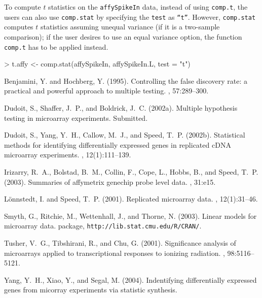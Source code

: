 \documentclass[11pt]{article}
\newcommand{\code}[1]{{\tt #1}}
\newcommand{\Rfunc}[1]{{\tt #1}}
\begin{document}
To compute $t$ statistics on the \code{affySpikeIn} data, instead of using
\Rfunc{comp.t}, the users can also use \Rfunc{comp.stat} by specifying 
the \code{test} as \code{``t''}. However, \Rfunc{comp.stat} computes $t$ 
statistics assuming unequal variance (if it is a two-sample comparison); if
the user desires to use an equal variance option, the function \Rfunc{comp.t}
has to be applied instead.

\begin{Schunk}
\begin{Sinput}
> t.affy <- comp.stat(affySpikeIn, affySpikeIn.L, test = "t")
\end{Sinput}
\end{Schunk}


\begin{thebibliography}{}

Benjamini, Y. and Hochberg, Y. (1995).
\newblock Controlling the false discovery rate: a practical and powerful
  approach to multiple testing.
, 57:289--300.

Dudoit, S., Shaffer, J.~P., and Boldrick, J.~C. (2002a).
\newblock Multiple hypothesis testing in microarray experiments.
\newblock Submitted.

Dudoit, S., Yang, Y.~H., Callow, M.~J., and Speed, T.~P. (2002b).
\newblock Statistical methods for identifying differentially expressed genes in
  replicated c{DNA} microarray experiments.
, 12(1):111--139.

Irizarry, R.~A., Bolstad, B.~M., Collin, F., Cope, L., Hobbs, B., and Speed,
  T.~P. (2003).
\newblock Summaries of affymetrix genechip probe level data.
, 31:e15.

L\"{o}nnstedt, I. and Speed, T.~P. (2001).
\newblock Replicated microarray data.
, 12(1):31--46.

Smyth, G., Ritchie, M., Wettenhall, J., and Thorne, N. (2003).
\newblock Linear models for microarray data.
 package, {\tt http://lib.stat.cmu.edu/R/CRAN/}.

Tusher, V.~G., Tibshirani, R., and Chu, G. (2001).
\newblock Significance analysis of microarrays applied to transcriptional
  responses to ionizing radiation.
, 98:5116--5121.

Yang, Y.~H., Xiao, Y., and Segal, M. (2004).
\newblock Indentifying differentially expressed genes from micorray experiments via 
  statistic synthesis.

\end{thebibliography}
\end{document}
